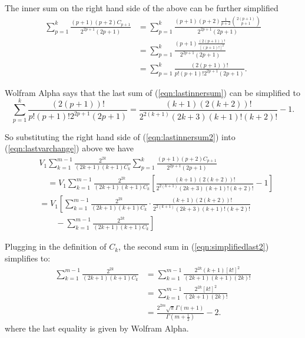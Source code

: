 \documentclass[11pt]{article}
\theoremstyle{definition}
\theoremstyle{definition}
\theoremstyle{plain}
\theoremstyle{plain}
\theoremstyle{plain}
\theoremstyle{definition}
\theoremstyle{definition}
\begin{document}
{The inner sum on the right hand side of the above can be further simplified
\begin{equation}\label{eqn:lastinnersum}
\begin{aligned}
\sum\limits_{p=1}^k\frac{(p+1)(p+2)C_{p+1}}{2^{2p+1}(2p+1)} &= \sum\limits_{p=1}^k\frac{(p+1)(p+2)\frac{1}{p+2}\binom{2(p+1)}{p+1}}{2^{2p+1}(2p+1)} \\
&= \sum\limits_{p=1}^k\frac{(p+1)\frac{(2(p+1))!}{[(p+1)!]^2}}{2^{2p+1}(2p+1)} \\
&= \sum\limits_{p=1}^k\frac{(2(p+1))!}{p!(p+1)!2^{2p+1}(2p+1)}.
\end{aligned}
\end{equation}

Wolfram Alpha says that the last sum of (\ref{eqn:lastinnersum}) can be simplified to
\begin{equation}\label{eqn:lastinnersum2}
\sum\limits_{p=1}^k\frac{(2(p+1))!}{p!(p+1)!2^{2p+1}(2p+1)} = \frac{(k+1)(2(k+2))!}{2^{2(k+1)}(2k+3)(k+1)!(k+2)!}-1.
\end{equation}

So substituting the right hand side of (\ref{eqn:lastinnersum2}) into (\ref{eqn:lastvarchange}) above we have
\begin{equation}\label{eqn:simplifiedlast2}
\begin{aligned}
&V_1\sum\limits_{k=1}^{m-1}\frac{2^{2k}}{(2k+1)(k+1)C_k}\sum\limits_{p=1}^k\frac{(p+1)(p+2)C_{p+1}}{2^{2p+1}(2p+1)} \\
&\quad=V_1\sum\limits_{k=1}^{m-1}\frac{2^{2k}}{(2k+1)(k+1)C_k}\left[\frac{(k+1)(2(k+2))!}{2^{2(k+1)}(2k+3)(k+1)!(k+2)!}-1\right] \\
&= V_1\left[\sum\limits_{k=1}^{m-1}\frac{2^{2k}}{(2k+1)(k+1)C_k}\cdot\frac{(k+1)(2(k+2))!}{2^{2(k+1)}(2k+3)(k+1)!(k+2)!}\right. \\
&\qquad - \left.\sum\limits_{k=1}^{m-1}\frac{2^{2k}}{(2k+1)(k+1)C_k}\right]
\end{aligned}
\end{equation}

Plugging in the definition of $C_k$, the second sum in (\ref{eqn:simplifiedlast2}) simplifies to:
\begin{equation}\label{eqn:lastsecond}
\begin{aligned}
\sum\limits_{k=1}^{m-1}\frac{2^{2k}}{(2k+1)(k+1)C_k} &= \sum\limits_{k=1}^{m-1}\frac{2^{2k}(k+1)[k!]^2}{(2k+1)(k+1)(2k)!} \\
&= \sum\limits_{k=1}^{m-1}\frac{2^{2k}[k!]^2}{(2k+1)(2k)!} \\
&= \frac{2^{2m}\sqrt{\pi}\Gamma(m+1)}{\Gamma(m+\frac{1}{2})}-2.
\end{aligned}
\end{equation}
where the last equality is given by Wolfram Alpha.

}
\end{document}
